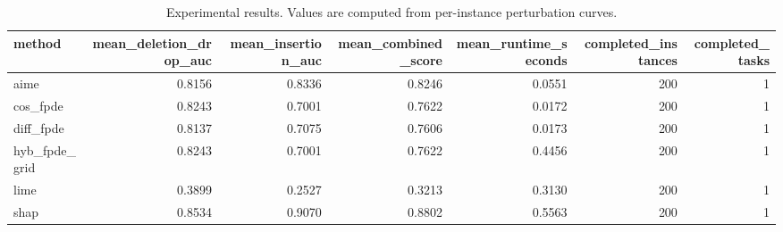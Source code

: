 \begin{table}[t]
\caption{Experimental results. Values are computed from per-instance perturbation curves.}
\label{tab:main_results_computed}
\centering
\begin{tabular}{lrrrrrr}
\toprule
method & mean\_deletion\_drop\_auc & mean\_insertion\_auc & mean\_combined\_score & mean\_runtime\_seconds & completed\_instances & completed\_tasks \\
\midrule
aime & 0.8156 & 0.8336 & 0.8246 & 0.0551 & 200 & 1 \\
cos\_fpde & 0.8243 & 0.7001 & 0.7622 & 0.0172 & 200 & 1 \\
diff\_fpde & 0.8137 & 0.7075 & 0.7606 & 0.0173 & 200 & 1 \\
hyb\_fpde\_grid & 0.8243 & 0.7001 & 0.7622 & 0.4456 & 200 & 1 \\
lime & 0.3899 & 0.2527 & 0.3213 & 0.3130 & 200 & 1 \\
shap & 0.8534 & 0.9070 & 0.8802 & 0.5563 & 200 & 1 \\
\bottomrule
\end{tabular}

\end{table}
